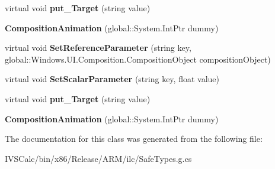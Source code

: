\begin{DoxyCompactItemize}
\item 
\mbox{\label{class_windows_1_1_u_i_1_1_composition_1_1_composition_animation_a59f79df972c8170dc1fd9329bb0fdb0c}} 
virtual void {\bfseries put\+\_\+\+Target} (string value)
\item 
\mbox{\label{class_windows_1_1_u_i_1_1_composition_1_1_composition_animation_ae967a843f8543e354ae2d891eaad7df5}} 
{\bfseries Composition\+Animation} (global\+::\+System.\+Int\+Ptr dummy)
\item 
\mbox{\label{class_windows_1_1_u_i_1_1_composition_1_1_composition_animation_a6aef4c6354f81b68470b59c2583862d0}} 
virtual void {\bfseries Set\+Reference\+Parameter} (string key, global\+::\+Windows.\+U\+I.\+Composition.\+Composition\+Object composition\+Object)
\item 
\mbox{\label{class_windows_1_1_u_i_1_1_composition_1_1_composition_animation_a9338e6aa927cdc031e0533dfec0fc5bb}} 
virtual void {\bfseries Set\+Scalar\+Parameter} (string key, float value)
\item 
\mbox{\label{class_windows_1_1_u_i_1_1_composition_1_1_composition_animation_a59f79df972c8170dc1fd9329bb0fdb0c}} 
virtual void {\bfseries put\+\_\+\+Target} (string value)
\item 
\mbox{\label{class_windows_1_1_u_i_1_1_composition_1_1_composition_animation_ae967a843f8543e354ae2d891eaad7df5}} 
{\bfseries Composition\+Animation} (global\+::\+System.\+Int\+Ptr dummy)
\end{DoxyCompactItemize}


The documentation for this class was generated from the following file\+:\begin{DoxyCompactItemize}
\item 
I\+V\+S\+Calc/bin/x86/\+Release/\+A\+R\+M/ilc/Safe\+Types.\+g.\+cs\end{DoxyCompactItemize}
